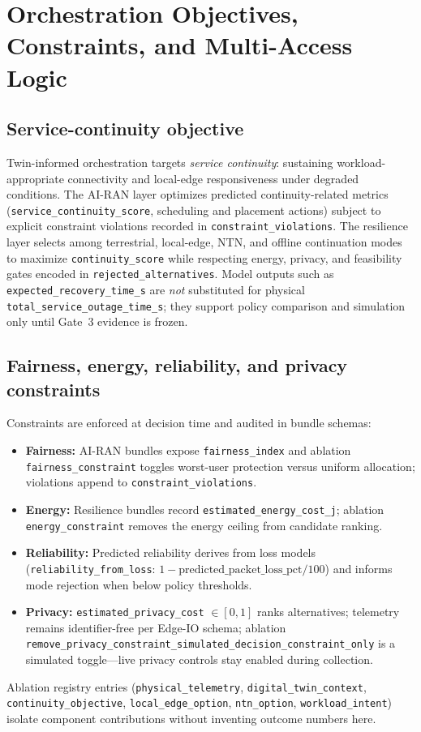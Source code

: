 \section{Orchestration Objectives, Constraints, and Multi-Access Logic}
\label{sec:orchestration}

\subsection{Service-continuity objective}
Twin-informed orchestration targets \emph{service continuity}: sustaining workload-appropriate connectivity and local-edge responsiveness under degraded conditions.
The AI-RAN layer optimizes predicted continuity-related metrics (\texttt{service\_continuity\_score}, scheduling and placement actions) subject to explicit constraint violations recorded in \texttt{constraint\_violations}.
The resilience layer selects among terrestrial, local-edge, NTN, and offline continuation modes to maximize \texttt{continuity\_score} while respecting energy, privacy, and feasibility gates encoded in \texttt{rejected\_alternatives}.
Model outputs such as \texttt{expected\_recovery\_time\_s} are \emph{not} substituted for physical \texttt{total\_service\_outage\_time\_s}; they support policy comparison and simulation only until Gate~3 evidence is frozen.

\subsection{Fairness, energy, reliability, and privacy constraints}
Constraints are enforced at decision time and audited in bundle schemas:
\begin{itemize}
  \item \textbf{Fairness:} AI-RAN bundles expose \texttt{fairness\_index} and ablation \texttt{fairness\_constraint} toggles worst-user protection versus uniform allocation; violations append to \texttt{constraint\_violations}.
  \item \textbf{Energy:} Resilience bundles record \texttt{estimated\_energy\_cost\_j}; ablation \texttt{energy\_constraint} removes the energy ceiling from candidate ranking.
  \item \textbf{Reliability:} Predicted reliability derives from loss models (\texttt{reliability\_from\_loss}: $1-\text{predicted\_packet\_loss\_pct}/100$) and informs mode rejection when below policy thresholds.
  \item \textbf{Privacy:} \texttt{estimated\_privacy\_cost} $\in[0,1]$ ranks alternatives; telemetry remains identifier-free per Edge-IO schema; ablation \texttt{remove\_privacy\_constraint\_simulated\_decision\_constraint\_only} is a simulated toggle---live privacy controls stay enabled during collection.
\end{itemize}
Ablation registry entries (\texttt{physical\_telemetry}, \texttt{digital\_twin\_context}, \texttt{continuity\_objective}, \texttt{local\_edge\_option}, \texttt{ntn\_option}, \texttt{workload\_intent}) isolate component contributions without inventing outcome numbers here.

